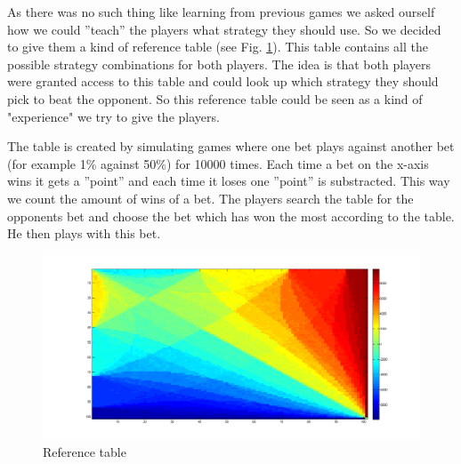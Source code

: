 \documentclass[11pt]{article}
\begin{document}
As there was no such thing like learning from previous games we asked ourself how we could ''teach'' the players what strategy they should use. So we decided to give them a kind of reference table (see Fig. \ref{refernce table}). This table contains all the possible strategy combinations for both players. The idea is that both players were granted access to this table and could look up which strategy they should pick to beat the opponent. So this reference table could be seen as a kind of "experience" we try to give the players.

The table is created by simulating games where one bet plays against another bet (for example 1\% against 50\%) for 10000 times. Each time a bet on the x-axis wins it gets a ''point'' and each time it loses one ''point'' is substracted. This way we count the amount of wins of a bet. The players search the table for the opponents bet and choose the bet which has won the most according to the table. He then plays with this bet.
\begin{figure}
	\includegraphics[scale=0.2]{plot_ref_10000_V1.png}
	\centering
	\caption{Reference table}
	\label{refernce table}
\end{figure}
\end{document}

